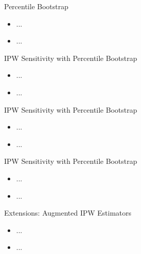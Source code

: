 \documentclass{beamer}
\begin{document}
\begin{frame}{Percentile Bootstrap}

\begin{itemize}
  \itemsep12pt
  \item ...
  \item ...
\end{itemize}

\end{frame}



\begin{frame}{IPW Sensitivity with Percentile Bootstrap}

\begin{itemize}
  \itemsep12pt
  \item ...
  \item ...
\end{itemize}

\end{frame}


\begin{frame}{IPW Sensitivity with Percentile Bootstrap}

\begin{itemize}
  \itemsep12pt
  \item ...
  \item ...
\end{itemize}

\end{frame}


\begin{frame}{IPW Sensitivity with Percentile Bootstrap}

\begin{itemize}
  \itemsep12pt
  \item ...
  \item ...
\end{itemize}

\end{frame}


\begin{frame}{Extensions: Augmented IPW Estimators}

\begin{itemize}
  \itemsep12pt
  \item ...
  \item ...
\end{itemize}

\end{frame}
\end{document}
